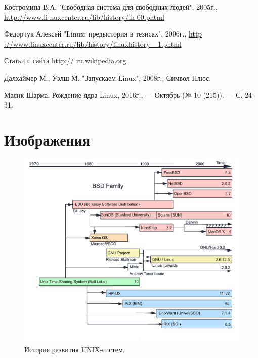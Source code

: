 \documentclass[bachelor, och, referat, times]{SCWorks}
\begin{document}
\begin{thebibliography}{99}
	 Костромина В.А. "Свободная 
	система для свободных 
	людей", 2005г.,
	\href{http://www.linuxcenter.ru/lib/history/
	lh-00.phtml}{http://www.li
	nuxcenter.ru/lib/history/lh-00.phtml}
	
	 Федорчук Алексей "Linux: 
	предыстория в тезисах", 
	2006г.,
	\href{http://www.linuxcenter.ru/lib/history/
	linuxhistory_1.phtml}{http
	://www.linuxcenter.ru/lib/history/linuxhistory
	\_1.phtml}
	
	 Статьи с сайта
	\href{http://ru.wikipedia.org}{http://
	ru.wikipedia.org}
	
	 Далхаймер М., Уэлш М. 
	"Запускаем Linux", 2008г., 
	Символ-Плюс.
	
	 Маянк Шарма. Рождение ядра 
	Linux, 2016г., — Октябрь (№
	10 (215)). — С. 24-31.
\end{thebibliography}

\appendix

\section{Изображения}

\begin{figure}[h]
    \centering
    \includegraphics[width=1\textwidth]
    {Timeline_of_Unix_families}
    \caption{История развития UNIX-систем.}
    \label{fig:hist}
\end{figure}
\end{document}
